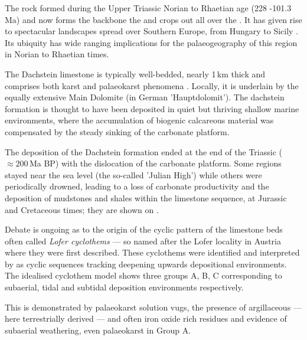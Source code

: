 The rock formed during the Upper Triassic Norian to Rhaetian age (228 -101.3\,Ma) and now forms the backbone the  \citep{bosellini1974triassic} and crops out all over the  \citep{fischer1975tidal,schwarzacher2005stratification}. It has given rise to spectacular landscapes spread over Southern Europe, from Hungary \citep{haas2004characteristics} to Sicily \citep{catalano1974ciclotemi}.
Its ubiquity has wide ranging implications for the palaeogeography of this region in Norian to Rhaetian times.

The Dachstein limestone is typically well-bedded, nearly 1\,km thick and comprises both karst and palaeokarst phenomena \citep{ogorelec1996dachstein,haas2007characteristics}. Locally, it is underlain by the equally extensive Main Dolomite (in German 'Hauptdolomit'). The dachstein formation is thought to have been deposited in quiet but thriving shallow marine environments, where the accumulation of biogenic calcareous material was compensated by the steady sinking of the carbonate platform. 

The deposition of the Dachstein formation ended at the end of the Triassic ($\approx200$\,Ma BP) with the dislocation of the carbonate platform. Some regions stayed near the sea level (the so-called 'Julian High') while others were periodically drowned, leading to a loss of carbonate productivity and the deposition of mudstones and shales within the limestone sequence, at  Jurassic and Cretaceous \citep{vsmuc2010jurassic} times; they are shown on .







Debate is ongoing as to the origin of the cyclic pattern of the limestone beds often called \emph{Lofer cyclothems} --- so named after the Lofer locality in Austria where they were first described. 
These cyclothems were identified and interpreted by \citet{fisher1964lofer} as cyclic sequences tracking deepening upwards depositional environments.
The idealised cyclothem model shows three groups A, B, C corresponding to  subaerial, tidal and subtidal deposition environments respectively.  

This is demonstrated by palaeokarst solution vugs, the presence of argillaceous --- here terrestrially derived --- and often iron oxide rich residues and evidence of subaerial weathering, even palaeokarst in Group A.

